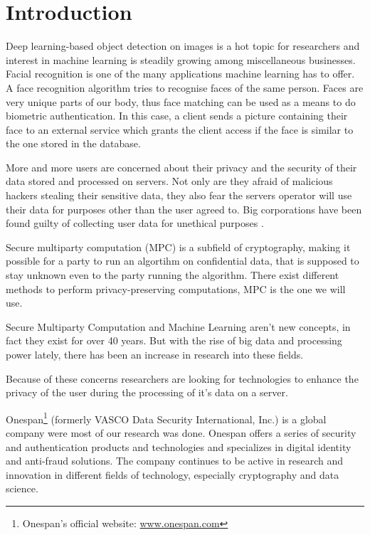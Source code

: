 
\chapter{Introduction}
Deep learning-based object detection on images is a hot topic for researchers and interest in machine learning is steadily growing among miscellaneous businesses. Facial recognition is one of the many applications machine learning has to offer. A face recognition algorithm tries to recognise faces of the same person. Faces are very unique parts of our body, thus face matching can be used as a means to do biometric authentication. In this case, a client sends a picture containing their face to an external service which grants the client access if the face is similar to the one stored in the database.

More and more users are concerned about their privacy and the security of their data stored and processed on servers. Not only are they afraid of malicious hackers stealing their sensitive data, they also fear the servers operator will use their data for purposes other than the user agreed to. Big corporations have been found guilty of collecting user data for unethical purposes \cite{cadwalladr2018revealed}.

Secure multiparty computation (MPC) is a subfield of cryptography, making it possible for a party to run an algortihm on confidential data, that is supposed to stay unknown even to the party running the algorithm. There exist different methods to perform privacy-preserving computations, MPC is the one we will use.

Secure Multiparty Computation and Machine Learning aren't new concepts, in fact they exist for over 40 years. But with the rise of big data and processing power lately, there has been an increase in research into these fields.

Because of these concerns researchers are looking for technologies to enhance the privacy of the user during the processing of it's data on a server.

Onespan\footnote{Onespan's official website: \url{www.onespan.com}} (formerly VASCO Data Security International, Inc.) is a global company were most of our research was done. Onespan offers a series of security and authentication products and technologies and specializes in digital identity and anti-fraud solutions. The company continues to be active in research and innovation in different fields of technology, especially cryptography and data science.

